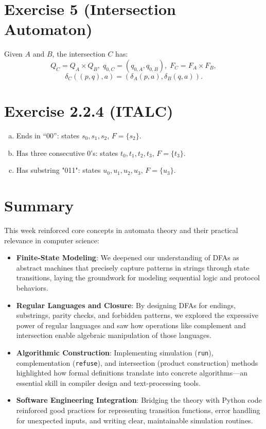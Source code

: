 \documentclass{article}
\begin{document}
\section*{Exercise 5 (Intersection Automaton)}
Given $A$ and $B$, the intersection $C$ has:
\[Q_C=Q_A\times Q_B,\;q_{0,C}=(q_{0,A},q_{0,B}),\;F_C=F_A\times F_B,\]
\[\delta_C((p,q),a)=(\delta_A(p,a),\delta_B(q,a)).\]

\section*{Exercise 2.2.4 (ITALC)}
\begin{enumerate}[a)]
  \item Ends in ``00'': states $s_0,s_1,s_2$, $F=\{s_2\}$.
  \item Has three consecutive 0’s: states $t_0,t_1,t_2,t_3$, $F=\{t_3\}$.
  \item Has substring "011": states $u_0,u_1,u_2,u_3$, $F=\{u_3\}$.
\end{enumerate}

\section*{Summary}
This week reinforced core concepts in automata theory and their practical relevance in computer science:
\begin{itemize}
  \item \textbf{Finite-State Modeling}: We deepened our understanding of DFAs as abstract machines that precisely capture patterns in strings through state transitions, laying the groundwork for modeling sequential logic and protocol behaviors.
  \item \textbf{Regular Languages and Closure}: By designing DFAs for endings, substrings, parity checks, and forbidden patterns, we explored the expressive power of regular languages and saw how operations like complement and intersection enable algebraic manipulation of those languages.
  \item \textbf{Algorithmic Construction}: Implementing simulation (\texttt{run}), complementation (\texttt{refuse}), and intersection (product construction) methods highlighted how formal definitions translate into concrete algorithms—an essential skill in compiler design and text-processing tools.
  \item \textbf{Software Engineering Integration}: Bridging the theory with Python code reinforced good practices for representing transition functions, error handling for unexpected inputs, and writing clear, maintainable simulation routines.
\end{itemize}
\end{document}
